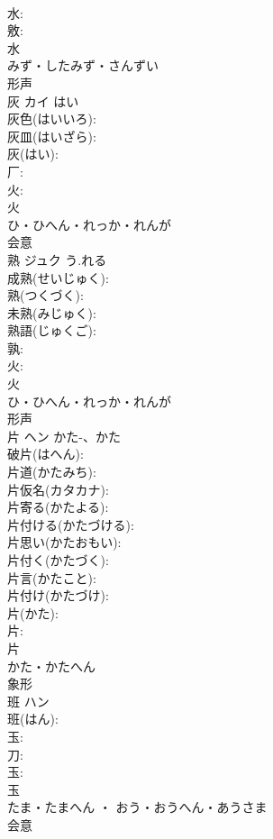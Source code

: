 \documentclass[8pt]{extreport}
\begin{document}
\begin{CJK}{UTF8}{min}
\\	水: 
\\	敫: 
\\	水	
\\	みず・したみず・さんずい	
\\	形声 
\\	灰	カイ	はい		
\\	灰色(はいいろ): 
\\	灰皿(はいざら): 
\\	灰(はい): 
\\	厂: 
\\	火: 
\\	火	
\\	ひ・ひへん・れっか・れんが	
\\	会意 
\\	熟	ジュク	う.れる		
\\	成熟(せいじゅく): 
\\	熟(つくづく): 
\\	未熟(みじゅく): 
\\	熟語(じゅくご): 
\\	孰: 
\\	火: 
\\	火	
\\	ひ・ひへん・れっか・れんが	
\\	形声 
\\	片	ヘン	かた-、かた		
\\	破片(はへん): 
\\	片道(かたみち): 
\\	片仮名(カタカナ): 
\\	片寄る(かたよる): 
\\	片付ける(かたづける): 
\\	片思い(かたおもい): 
\\	片付く(かたづく): 
\\	片言(かたこと): 
\\	片付け(かたづけ): 
\\	片(かた): 
\\	片: 
\\	片	
\\	かた・かたへん	
\\	象形 
\\	班	ハン			
\\	班(はん): 
\\	玉: 
\\	刀: 
\\	玉: 
\\	玉	
\\	たま・たまへん ・ おう・おうへん・あうさま	
\\	会意 

\end{CJK}
\end{document}
